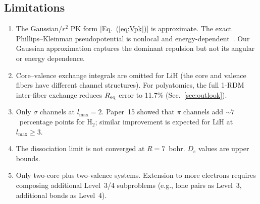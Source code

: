 \documentclass[aps,pra,twocolumn,superscriptaddress,longbibliography,floatfix]{revtex4-2}
\begin{document}
\subsection{Limitations}
\label{sec:limitations}

\begin{enumerate}
\item The Gaussian$/r^2$ PK form [Eq.~(\ref{eq:Vpk})] is approximate.
  The exact Phillips--Kleinman pseudopotential is nonlocal and
  energy-dependent~\cite{pk1959}.  Our Gaussian approximation captures
  the dominant repulsion but not its angular or energy dependence.

\item Core--valence exchange integrals are omitted for LiH (the core
  and valence fibers have different channel structures).  For
  polyatomics, the full 1-RDM inter-fiber exchange reduces
  $R_{\rm eq}$ error to 11.7\% (Sec.~\ref{sec:outlook}).

\item Only $\sigma$ channels at $l_{\max} = 2$.  Paper~15 showed that
  $\pi$ channels add ${\sim}7$~percentage points for H$_2$; similar
  improvement is expected for LiH at $l_{\max} \geq 3$.

\item The dissociation limit is not converged at $R = 7$~bohr.
  $D_e$ values are upper bounds.

\item Only two-core plus two-valence systems.  Extension to more
  electrons requires composing additional Level~3/4 subproblems (e.g.,
  lone pairs as Level~3, additional bonds as Level~4).
\end{enumerate}
\end{document}
